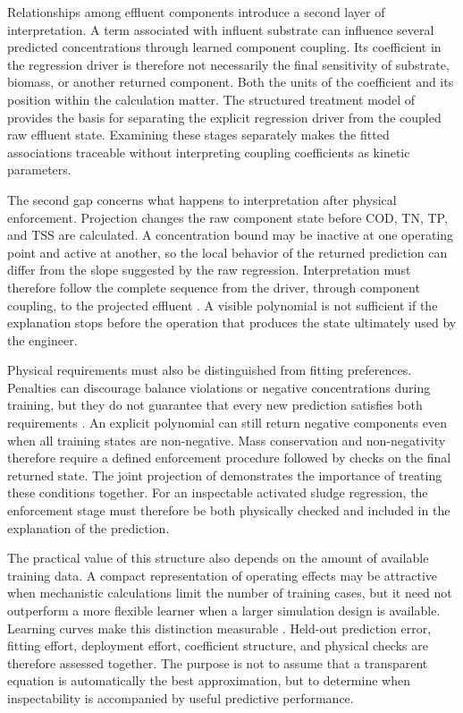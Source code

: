 Relationships among effluent components introduce a second layer of interpretation. A term associated with influent substrate can influence several predicted concentrations through learned component coupling. Its coefficient in the regression driver is therefore not necessarily the final sensitivity of substrate, biomass, or another returned component. Both the units of the coefficient and its position within the calculation matter. The structured treatment model of \citet{Selerio2026} provides the basis for separating the explicit regression driver from the coupled raw effluent state. Examining these stages separately makes the fitted associations traceable without interpreting coupling coefficients as kinetic parameters.

The second gap concerns what happens to interpretation after physical enforcement. Projection changes the raw component state before COD, TN, TP, and TSS are calculated. A concentration bound may be inactive at one operating point and active at another, so the local behavior of the returned prediction can differ from the slope suggested by the raw regression. Interpretation must therefore follow the complete sequence from the driver, through component coupling, to the projected effluent \citep{Selerio2026}. A visible polynomial is not sufficient if the explanation stops before the operation that produces the state ultimately used by the engineer.

Physical requirements must also be distinguished from fitting preferences. Penalties can discourage balance violations or negative concentrations during training, but they do not guarantee that every new prediction satisfies both requirements \citep{Hansen2024}. An explicit polynomial can still return negative components even when all training states are non-negative. Mass conservation and non-negativity therefore require a defined enforcement procedure followed by checks on the final returned state. The joint projection of \citet{KircherVotsmeier2025} demonstrates the importance of treating these conditions together. For an inspectable activated sludge regression, the enforcement stage must therefore be both physically checked and included in the explanation of the prediction.

The practical value of this structure also depends on the amount of available training data. A compact representation of operating effects may be attractive when mechanistic calculations limit the number of training cases, but it need not outperform a more flexible learner when a larger simulation design is available. Learning curves make this distinction measurable \citep{VieringLoog2023}. Held-out prediction error, fitting effort, deployment effort, coefficient structure, and physical checks are therefore assessed together. The purpose is not to assume that a transparent equation is automatically the best approximation, but to determine when inspectability is accompanied by useful predictive performance.

